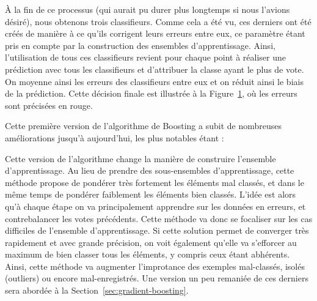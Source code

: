 À la fin de ce processus (qui aurait pu durer plus longtemps si nous l'avions désiré), nous obtenons trois classifieurs. Comme cela a été vu, ces derniers ont été créés de manière à ce qu'ils corrigent leurs erreurs entre eux, ce paramètre étant pris en compte par la construction des ensembles d'apprentissage. Ainsi, l'utilisation de tous ces classifieurs revient pour chaque point à réaliser une prédiction avec tous les classifieurs et d'attribuer la classe ayant le plus de vote. On moyenne ainsi les erreurs des classifieurs entre eux et on réduit ainsi le biais de la prédiction. Cette décision finale est illustrée à la Figure~\ref{fig:boosting_final}, où les erreurs sont précisées en rouge.

\begin{figure}[h]
	\label{fig:boosting_final}
\end{figure}

Cette première version de l'algorithme de Boosting a subit de nombreuses améliorations jusqu'à aujourd'hui, les plus notables étant :
\begin{itemize}
	Cette version de l'algorithme change la manière de construire l'ensemble d'apprentissage. Au lieu de prendre des sous-ensembles d'apprentissage, cette méthode propose de pondérer très fortement les éléments mal classés, et dans le même temps de pondérer faiblement les éléments bien classés. L'idée est alors qu'à chaque étape on va principalement apprendre sur les données en erreurs, et contrebalancer les votes précédents. Cette méthode va donc se focaliser sur les cas \og difficiles\fg{} de l'ensemble d'apprentissage. Si cette solution permet de converger très rapidement et avec grande précision, on voit également qu'elle va s'efforcer au maximum de bien classer tous les éléments, y compris ceux étant abhérents. Ainsi, cette méthode va augmenter l'improtance des exemples mal-classés, isolés (outliers) ou encore mal-enregistrés.
	Une version un peu remaniée de ces derniers sera abordée à la Section~\ref{sec:gradient-boosting}.
\end{itemize}